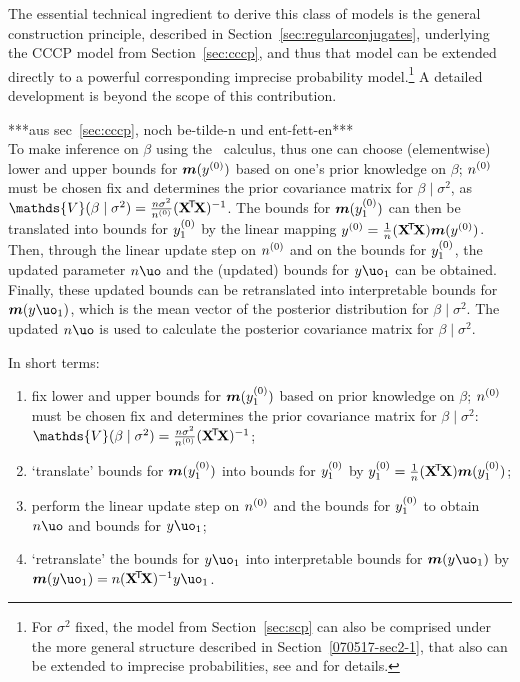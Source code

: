 The essential technical ingredient to derive this class of models is the general construction principle,
described in Section~\ref{sec:regularconjugates},
underlying the CCCP model from Section~\ref{sec:cccp}, and thus that model can be extended directly to
a powerful corresponding imprecise probability model.\footnote{For $\sigma^2$ fixed, the model from
Section~\ref{sec:scp} can also be comprised under the more general structure described in Section~\ref{070517-sec2-1},
that also can be extended to imprecise probabilities, see \textcite{Walter2007a} and \textcite{Walter2006a} for details.}
A detailed development is beyond the scope of this contribution. %

\iffalse
***aus sec~\ref{sec:cccp}, noch be-tilde-n und ent-fett-en***\\
To make inference on $\beta$ using the \nymodel\ calculus, thus one can choose (elementwise) lower
and upper bounds for $\boldsymbol{m}(y^{(0)})$ based on one's prior knowledge on $\beta$; $n^{(0)}$ must be chosen fix and
determines the prior covariance matrix for $\beta\mid\sigma^2$, as $\mathds{V}(\beta\mid\sigma^2) = \frac{n\sigma^2}{n\uz}(\XtX)^{-1}$.
The bounds for $\boldsymbol{m}(y^{(0)}_1)$ can then be translated into bounds for $y^{(0)}_1$ by the linear
mapping $y^{(0)} = \frac{1}{n}(\mathbf{X}^{{\mbox{\!\scriptsize\textsf{T}}}} \! \mathbf{X}) \boldsymbol{m}(y^{(0)})$.
Then, through the linear update step on $n^{(0)}$ and on the bounds for
$y^{(0)}_1$, the updated parameter $n\uo$ and the (updated) bounds for $y\uo_1$ can be obtained.
Finally, these updated bounds can be retranslated into interpretable bounds for $\bs{m}(y\uo_1)$, which is
the mean vector of the posterior distribution for $\beta\mid\sigma^2$. The updated $n\uo$ is used to calculate the
posterior covariance matrix for $\beta\mid\sigma^2$.

In short terms:
\begin{enumerate}
\item fix lower and upper bounds for $\boldsymbol{m}(y^{(0)}_1)$ based on prior
knowledge on $\beta$; $n^{(0)}$ must be chosen fix %
and determines the prior covariance matrix for $\beta\mid\sigma^2$:
$\mathds{V}(\beta\mid\sigma^2) = \frac{n\sigma^2}{n\uz}(\XtX)^{-1}$;
\item `translate' bounds for $\boldsymbol{m}(y^{(0)}_1)$ into bounds for $y^{(0)}_1$ by
$y^{(0)}_1 = \frac{1}{n}(\mathbf{X}^{{\mbox{\!\scriptsize\textsf{T}}}} \! \mathbf{X}) \boldsymbol{m}(y^{(0)}_1)$;
\item perform the linear update step on $n^{(0)}$ and the bounds for
$y^{(0)}_1$ to obtain $n\uo$ and bounds for $y\uo_1$;
\item `retranslate' the bounds for $y\uo_1$ into interpretable
bounds for $\bs{m}(y\uo_1)$ by $\bs{m}(y\uo_1) = n (\XtX)^{-1} y\uo_1$.
\end{enumerate}


